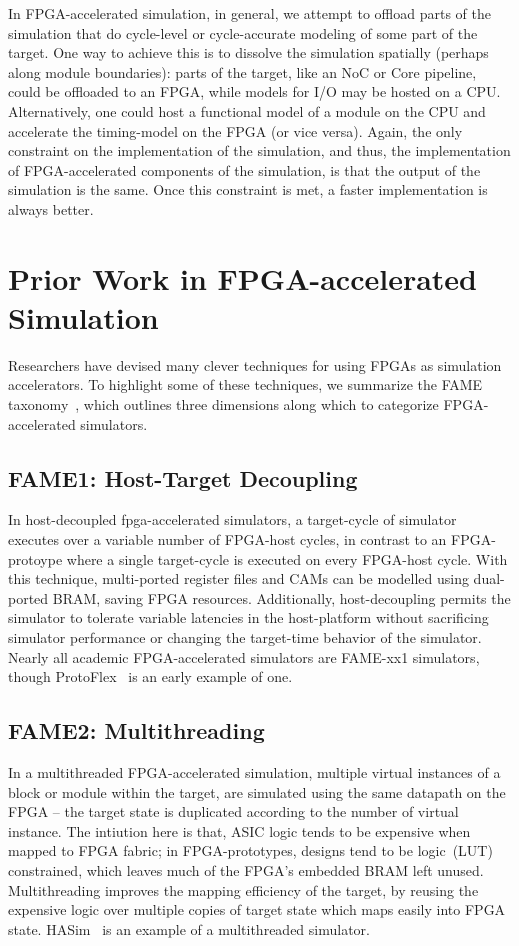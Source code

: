In FPGA-accelerated simulation, in general, we attempt to offload parts of the
simulation that do cycle-level or cycle-accurate modeling of some part of the
target. One way to achieve this is to dissolve the simulation spatially
(perhaps along module boundaries): parts of the target, like an NoC or Core
pipeline, could be offloaded to an FPGA, while models for I/O may be hosted on
a CPU.  Alternatively, one could host a functional model of a module on the CPU
and accelerate the timing-model on the FPGA (or vice versa).  Again, the only
constraint on the implementation of the simulation, and thus, the
implementation of FPGA-accelerated components of the simulation, is that the
output of the simulation is the same. Once this constraint is met, a faster
implementation is always better.

\section{Prior Work in FPGA-accelerated Simulation}

Researchers have devised many clever techniques for using FPGAs as simulation
accelerators. To highlight some of these techniques, we summarize the FAME
taxonomy~\cite{fame}, which outlines three dimensions along which to categorize
FPGA-accelerated simulators.

\subsection{FAME1: Host-Target Decoupling}

In host-decoupled fpga-accelerated simulators, a target-cycle of simulator
executes over a variable number of FPGA-host cycles, in contrast to an
FPGA-protoype where a single target-cycle is executed on every FPGA-host cycle.
With this technique, multi-ported register files and CAMs can be modelled using
dual-ported BRAM, saving FPGA resources. Additionally, host-decoupling permits
the simulator to tolerate variable latencies in the host-platform without
sacrificing simulator performance or changing the target-time behavior of the
simulator. Nearly all academic FPGA-accelerated simulators are FAME-xx1
simulators, though ProtoFlex~\cite{protoflex} is an early example of one.

\subsection{FAME2: Multithreading}

In a multithreaded FPGA-accelerated simulation, multiple virtual instances of a
block or module within the target, are simulated using the same datapath on the
FPGA -- the target state is duplicated according to the number of virtual
instance. The intiution here is that, ASIC logic tends to be expensive when
mapped to FPGA fabric; in FPGA-prototypes, designs tend to be logic~(LUT)
constrained, which leaves much of the FPGA's embedded BRAM left unused.
Multithreading improves the mapping efficiency of the target, by reusing the
expensive logic over multiple copies of target state which maps easily into
FPGA state. HASim~\cite{hasim} is an example of a multithreaded simulator.


